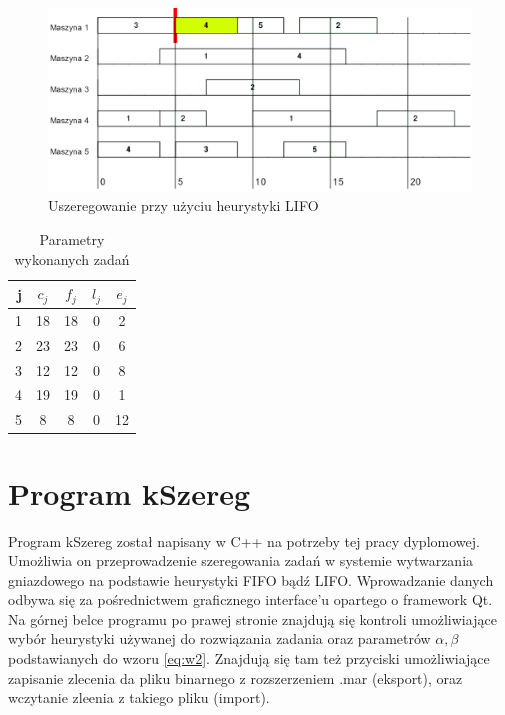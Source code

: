 \documentclass[twoside]{kInzynierka}
\begin{document}
\begin{figure}[htb]
    \centering
    \includegraphics[width=\textwidth, keepaspectratio=true]{./obrazki/lifo}
    \caption{Uszeregowanie przy użyciu heurystyki LIFO}
\end{figure}
\begin{table}[htb]
	\centering
	\begin{tabular}{ | r | c | c | c | c |}
	\hline
	j	& \(c_j\)	& \(f_j\)	& \(l_j\)	& \(e_j\)	\\ \hline
	1	& 18	& 18	& 0	& 2	\\ \hline
	2	& 23	& 23	& 0	& 6	\\ \hline
	3	& 12	& 12	& 0	& 8	\\ \hline
	4	& 19	& 19	& 0	& 1	\\ \hline
	5	& 8	& 8	& 0	& 12	\\ \hline
	\end{tabular}
	\caption{Parametry wykonanych zadań}
\end{table}
       
\section        {Program kSzereg}
Program kSzereg został napisany w C++ na potrzeby tej pracy dyplomowej. Umożliwia on przeprowadzenie szeregowania zadań w systemie wytwarzania gniazdowego na podstawie heurystyki FIFO bądź LIFO. Wprowadzanie danych odbywa się za pośrednictwem graficznego interface'u opartego o framework Qt. Na górnej belce programu po prawej stronie znajdują się kontroli umożliwiające wybór heurystyki używanej do rozwiązania zadania oraz parametrów \(\alpha, \beta\) podstawianych do wzoru \eqref{eq:w2}. Znajdują się tam też przyciski umożliwiające zapisanie zlecenia da pliku binarnego z rozszerzeniem .mar (eksport), oraz wczytanie zleenia z takiego pliku (import). 
\end{document}
